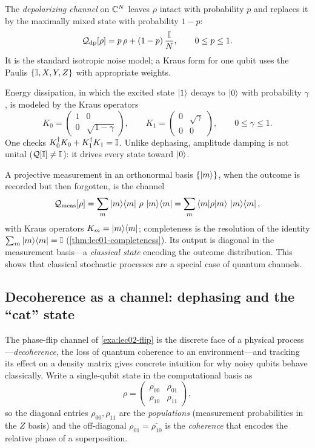 \begin{example}\label{exa:lec02-depol}
The \emph{depolarizing channel} on $\mathbb{C}^{N}$ leaves $\rho$ intact with probability
$p$ and replaces it by the maximally mixed state with probability $1-p$:
\[
  \mathcal{Q}_{\mathrm{dp}}[\rho]=p\,\rho+(1-p)\,\frac{\mathbb{I}}{N},\qquad 0\le p\le1.
\]
It is the standard isotropic noise model; a Kraus form for one qubit uses the
Paulis $\{\mathbb{I},X,Y,Z\}$ with appropriate weights.
\end{example}

\begin{example}\label{exa:lec02-ad}
Energy dissipation, in which the excited state $\ket{1}$ decays to $\ket{0}$ with
probability $\gamma$, is modeled by the Kraus operators
\[
  K_0=\begin{pmatrix}1&0\\0&\sqrt{1-\gamma}\end{pmatrix},\qquad
  K_1=\begin{pmatrix}0&\sqrt{\gamma}\\0&0\end{pmatrix},\qquad 0\le\gamma\le1.
\]
One checks $K_0^{\dagger} K_0+K_1^{\dagger} K_1=\mathbb{I}$. Unlike dephasing, amplitude damping is not
unital ($\mathcal{Q}[\mathbb{I}]\ne\mathbb{I}$): it drives every state toward $\ket{0}$.
\end{example}

\begin{example}\label{exa:lec02-meas}
A projective measurement in an orthonormal basis $\{\ket{m}\}$, when the outcome is
recorded but then forgotten, is the channel
\[
  \mathcal{Q}_{\mathrm{meas}}[\rho]=\sum_m \ket{m}\!\bra{m}\,\rho\,\ket{m}\!\bra{m}
   =\sum_m \braket{m|\rho|m}\,\ket{m}\!\bra{m},
\]
with Kraus operators $K_m=\ket{m}\!\bra{m}$; completeness is the resolution of the
identity $\sum_m\ket{m}\!\bra{m}=\mathbb{I}$ (\cref{thm:lec01-completeness}). Its output is
diagonal in the measurement basis---a \emph{classical state} encoding the outcome
distribution. This shows that classical stochastic processes are a special case of
quantum channels.
\end{example}

\subsection{Decoherence as a channel: dephasing and the ``cat'' state}
\label{sec:lec02-6}

The phase-flip channel of \cref{exa:lec02-flip} is the discrete face of a physical
process---\emph{decoherence}, the loss of quantum coherence to an environment---and
tracking its effect on a density matrix gives concrete intuition for why noisy
qubits behave classically. Write a single-qubit state in the computational basis as
\[
  \rho=\begin{pmatrix}\rho_{00}&\rho_{01}\\ \rho_{10}&\rho_{11}\end{pmatrix},
\]
so the diagonal entries $\rho_{00},\rho_{11}$ are the \emph{populations} (measurement
probabilities in the $Z$ basis) and the off-diagonal $\rho_{01}=\overline{\rho_{10}}$
is the \emph{coherence} that encodes the relative phase of a superposition.

